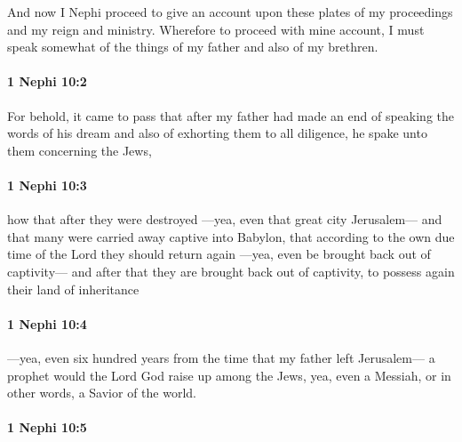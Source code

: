 			And now I Nephi proceed to give an account upon these plates
			of my proceedings and my reign and ministry.
			Wherefore to proceed with mine account,
			I must speak somewhat of the things of my father and also of my brethren.

		\paragraph{1 Nephi 10:2} %
			\label{1NEPHI-10-2}

			For behold, it came to pass that after my father had made an end
			of speaking the words of his dream and also of exhorting them to all diligence,
			he spake unto them concerning the Jews,

		\paragraph{1 Nephi 10:3} %
			\label{1NEPHI-10-3}

			how that after they were destroyed
			---yea, even that great city Jerusalem---
			and that many were carried away captive into Babylon,
			that according to the own due time of the Lord they should return again
			---yea, even be brought back out of captivity---
			and after that they are brought back out of captivity,
			to possess again their land of inheritance

		\paragraph{1 Nephi 10:4} %
			\label{1NEPHI-10-4}

			---yea, even six hundred years from the time that my father left Jerusalem---
			a prophet would the Lord God raise up among the Jews,
			yea, even a Messiah, or in other words, a Savior of the world.

		\paragraph{1 Nephi 10:5} %
			\label{1NEPHI-10-5}

